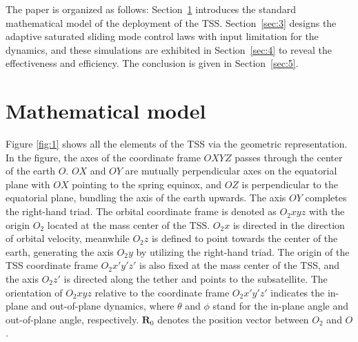 \documentclass[3p]{elsarticle}
\theoremstyle{plain}
\theoremstyle{remark}
\begin{document}
The paper is organized as follows: Section~\ref{sec:2} introduces the standard mathematical model of the deployment of the TSS. Section~\ref{sec:3} designs the adaptive saturated sliding mode control laws with input limitation for the dynamics, and these simulations are exhibited in Section~\ref{sec:4} to reveal the effectiveness and efficiency. The conclusion is given in Section~\ref{sec:5}.
\section{Mathematical model}\label{sec:2}
Figure \ref{fig:1} shows all the elements of the TSS via the geometric representation. In the figure, the axes of the coordinate frame $OXYZ$ passes through the center of the earth $O$. $OX$ and $OY$ are mutually perpendicular axes on the equatorial plane with $OX$ pointing to the spring equinox, and $OZ$ is perpendicular to the equatorial plane, bundling the axis of the earth upwards. The axis $OY$ completes the right-hand triad. The orbital coordinate frame is denoted as $O_2xyz$ with the origin $O_2$ located at the mass center of the TSS. $O_2x$ is directed in the direction of orbital velocity, meanwhile $O_2z$ is defined to point towards the center of the earth, generating the axis $O_2y$ by utilizing the right-hand triad. The origin of the TSS coordinate frame $O_2x'y'z'$ is also fixed at the mass center of the TSS, and the axis $O_2z'$ is directed along the tether and points to the subsatellite. The orientation of $O_2xyz$ relative to the coordinate frame $O_2x'y'z'$ indicates the in-plane and out-of-plane dynamics, where $\theta$ and $\phi$ stand for the in-plane angle and out-of-plane angle, respectively. $\bm R_0$ denotes the position vector between $O_2$ and $O$.
\end{document}
